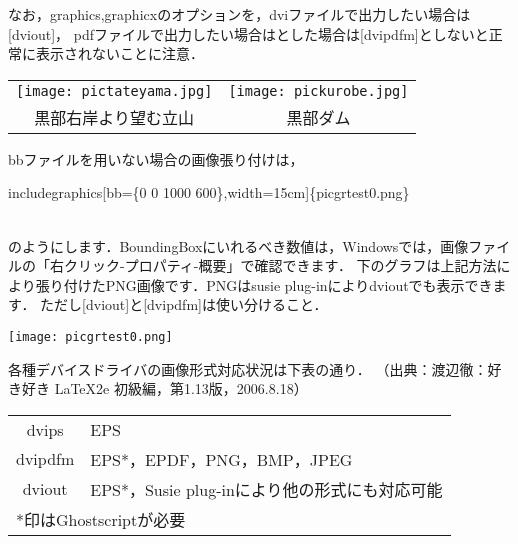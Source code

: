 \documentclass[a4paper,10pt]{jsarticle}
\begin{document}
なお，graphics,graphicxのオプションを，dviファイルで出力したい場合は[dviout]，
pdfファイルで出力したい場合はとした場合は[dvipdfm]としないと正常に表示されないことに注意．

\begin{center}
\begin{tabular}{cc}
\texttt{[image: pictateyama.jpg]}
&
\texttt{[image: pickurobe.jpg]}
\\
黒部右岸より望む立山&黒部ダム\\
\end{tabular}
\end{center}

bbファイルを用いない場合の画像張り付けは，\\
\centerline{\yen includegraphics[bb=\{0 0 1000 600\},width=15cm]\{picgrtest0.png\}}\\
のようにします．BoundingBoxにいれるべき数値は，Windowsでは，画像ファイルの「右クリック-プロパティ-概要」で確認できます．
下のグラフは上記方法により張り付けたPNG画像です．PNGはsusie plug-inによりdvioutでも表示できます．
ただし[dviout]と[dvipdfm]は使い分けること．

\texttt{[image: picgrtest0.png]}%

各種デバイスドライバの画像形式対応状況は下表の通り．
（出典：渡辺徹：好き好き LaTeX2e 初級編，第1.13版，2006.8.18）

\begin{center}
\begin{tabular}{cl}\hline
dvips   & EPS \\
dvipdfm & EPS*，EPDF，PNG，BMP，JPEG \\
dviout  & EPS*，Susie plug-inにより他の形式にも対応可能 \\ \hline
\multicolumn{2}{l}{*印はGhostscriptが必要}\\
\end{tabular}
\end{center}
\end{document}
